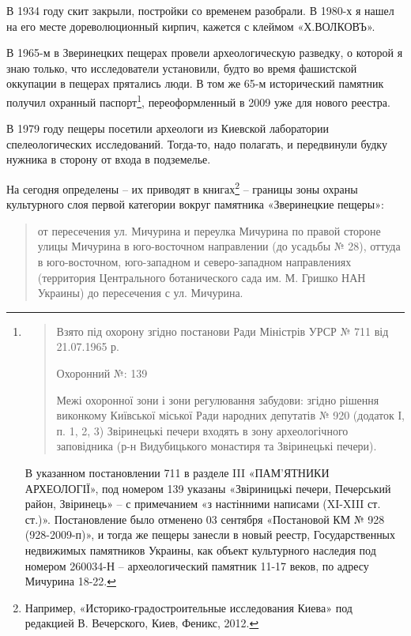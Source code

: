 В 1934 году скит закрыли, постройки со временем разобрали. В 1980-х я нашел на его месте дореволюционный кирпич, кажется с клеймом «Х.ВОЛКОВЪ».

В 1965-м в Зверинецких пещерах провели археологическую разведку, о которой я знаю только, что исследователи установили, будто во время фашистской оккупации в пещерах прятались люди. В том же 65-м исторический памятник получил охранный паспорт\footnote{
\begin{quotation}
Взято під охорону згідно постанови Ради Міністрів УРСР № 711 від 21.07.1965 р.

Охоронний №: 139

Межі охоронної зони і зони регулювання забудови: згідно рішення виконкому Київської міської Ради народних депутатів № 920 (додаток І, п. 1, 2, 3) Звіринецькі печери входять в зону археологічного заповідника (р-н Видубицького монастиря та Звіринецькі печери). 
\end{quotation}

В указанном постановлении 711 в разделе III «ПАМ'ЯТНИКИ АРХЕОЛОГІЇ», под номером 
139 указаны «Звіриницькі печери, Печерський район, Звіринець» – с примечанием «з настінними написами (XI-XIII ст. ст.)». Постановление было отменено 03 сентября «Постановой КМ № 928 (928-2009-п)», и тогда же пещеры занесли в новый реестр, Государственных недвижимых памятников Украины, как объект культурного наследия под номером 260034-Н – археологический памятник 11-17 веков, по адресу Мичурина 18-22.}, переоформленный в 2009 уже для нового реестра.

В 1979 году пещеры посетили археологи из Киевской лаборатории спелеологических исследований. Тогда-то, надо полагать, и передвинули будку нужника в сторону от входа в подземелье.

На сегодня определены – их приводят в книгах\footnote{Например, «Историко-градостроительные исследования Киева» под редакцией В. Вечерского, Киев, Феникс, 2012.} – границы зоны охраны культурного слоя первой категории вокруг памятника «Зверинецкие пещеры»:


\begin{quotation}
от пересечения ул. Мичурина и переулка Мичурина по правой стороне улицы Мичурина в юго-восточном направлении (до усадьбы № 28), оттуда в юго-восточном, юго-западном и северо-западном направлениях (территория Центрального ботанического сада им. М. Гришко НАН Украины) до пересечения с ул. Мичурина.
\end{quotation}

